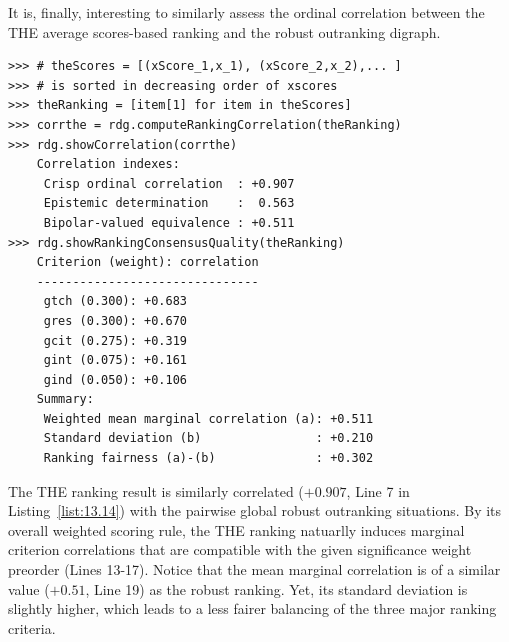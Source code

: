 It is, finally, interesting to similarly assess the ordinal correlation between the THE average scores-based ranking and the robust outranking digraph.
\begin{lstlisting}[caption={Computing the ordinal quality of the THE ranking},label=list:13.14]
>>> # theScores = [(xScore_1,x_1), (xScore_2,x_2),... ]
>>> # is sorted in decreasing order of xscores
>>> theRanking = [item[1] for item in theScores]
>>> corrthe = rdg.computeRankingCorrelation(theRanking)
>>> rdg.showCorrelation(corrthe)
    Correlation indexes:
     Crisp ordinal correlation  : +0.907
     Epistemic determination    :  0.563
     Bipolar-valued equivalence : +0.511
>>> rdg.showRankingConsensusQuality(theRanking)
    Criterion (weight): correlation
    -------------------------------
     gtch (0.300): +0.683
     gres (0.300): +0.670
     gcit (0.275): +0.319
     gint (0.075): +0.161
     gind (0.050): +0.106
    Summary:
     Weighted mean marginal correlation (a): +0.511
     Standard deviation (b)                : +0.210
     Ranking fairness (a)-(b)              : +0.302
\end{lstlisting}

The THE ranking result is similarly correlated ($+0.907$, Line 7 in Listing~\ref{list:13.14}) with the pairwise global robust outranking situations. By its overall weighted scoring rule, the THE ranking natuarlly induces marginal criterion correlations that are compatible with the given significance weight preorder (Lines 13-17). Notice that the mean marginal correlation is of a similar value ($+0.51$, Line 19) as the robust \NetFlows ranking. Yet, its standard deviation is slightly higher, which leads to a less fairer balancing of the three major ranking criteria.

